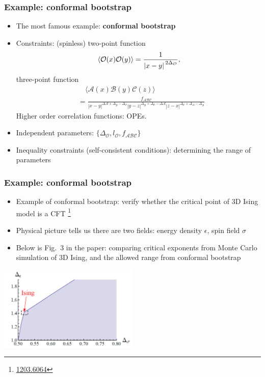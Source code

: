 \documentclass{beamer}
\newcommand{\concept}[1]{\textbf{#1}}
\begin{document}
\begin{frame}
\frametitle{Example: conformal bootstrap}

\begin{itemize}
    \item The most famous example: \concept{conformal bootstrap}
    \item Constraints: (spinless) two-point function 
    \begin{equation}
        \expval*{\mathcal{O}(x) \mathcal{O}(y)} = \frac{1}{\abs*{x - y}^{2 \Delta_\mathcal{O}}},
    \end{equation}
    three-point function 
    \begin{equation}
        \begin{aligned}
            &\quad \langle\mathcal{A}(x) \mathcal{B}(y) \mathcal{C}(z)\rangle \\
            &= \frac{f_{\mathcal{A B C}}}{|x-y|^{\Delta \mathcal{A}+\Delta_{\mathcal{B}}-\Delta_{\mathcal{C}}}|y-z|^{\Delta_{\mathcal{B}}+\Delta_{\mathcal{C}}-\Delta \mathcal{A}}|z-x|^{\Delta_{\mathcal{C}}+\Delta_{\mathcal{A}}-\Delta_{\mathcal{B}}}}
        \end{aligned}
    \end{equation}
    Higher order correlation functions: OPEs. 
    \item Independent parameters: $\{\Delta_{\mathcal{O}}, l_{\mathcal{O}}, f_{\mathcal{A} \mathcal{B} \mathcal{C}}\}$
    \item Inequality constraints (self-consistent conditions): determining the range of parameters
\end{itemize}

\end{frame}

\begin{frame}
\frametitle{Example: conformal bootstrap}

\begin{itemize}
    \item Example of conformal bootstrap: verify whether the critical point of 3D Ising model 
    is a CFT \footnote{\href{https://arxiv.org/abs/1203.6064}{1203.6064} }
    \item Physical picture tells us there are two fields: energy density $\epsilon$, spin field $\sigma$
    \item Below is Fig.~3 in the paper: comparing critical exponents from Monte Carlo simulation of 3D Ising, and the allowed range from conformal bootstrap
\end{itemize}

\begin{center}
    \includegraphics[width=0.5\textwidth]{3d-ising-cft-bootstrap-range.PNG}
\end{center}

\end{frame}
\end{document}

